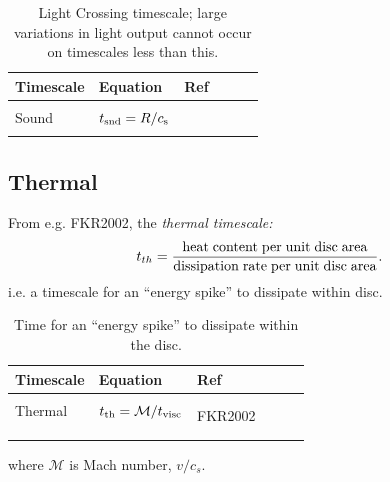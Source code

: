 \documentclass[11pt]{article}
\begin{document}
\begin{table}
  \begin{center}
    \begin{tabular}{l l l l l l} 
      \hline
      \hline 
      Timescale           &                       Equation    &  Ref  \\
      \hline  
       &&& \\
       Sound  &  $t_{\rm snd} = R/c_{\rm s}$                                                 &      \\
        &&& \\
         \hline
         \hline 
       \end{tabular}
      \caption{Light Crossing timescale; large variations in light output cannot occur on timescales less than this.}
      \label{tab:lightcrossing}
    \end{center}
\end{table}

\subsection{Thermal}
From e.g. FKR2002, the {\it thermal timescale:}
\begin{equation}
t_{th} = \frac{\rm heat \; content \; per \; unit \; disc \; area}{\rm dissipation \;  rate \; per \; unit \; disc \; area}.
\end{equation}
i.e. a timescale for an ``energy spike'' to dissipate within disc. 

\begin{table}
  \begin{center}
    \begin{tabular}{l l l l l l} 
      \hline
      \hline 
      Timescale           &                       Equation    &  Ref  \\
      \hline  
       &&& \\
       Thermal  &     $t_{\rm th} = \mathcal{M} / t_{\rm visc}$                                                 &  \multirow{3}{*}{FKR2002}      \\
                  &                                   &  \\
                  &       &  \\
        &&& \\
         \hline
         \hline 
       \end{tabular}
      \caption{Time for an ``energy spike'' to dissipate within the disc.}
      \label{tab:lightcrossing}
    \end{center}
\end{table}
where $\mathcal{M}$ is Mach number,  $v/c_{s}$. 
\end{document}
